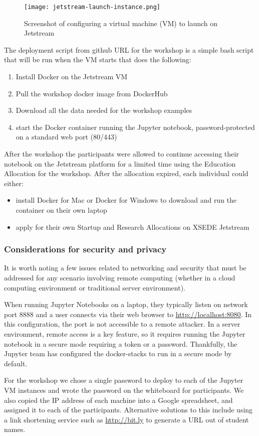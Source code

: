\begin{figure}[h]
\centering
\texttt{[image: jetstream-launch-instance.png]}
\caption{Screenshot of configuring a virtual machine (VM) to launch on Jetstream}
\end{figure}

The deployment script from github URL for the workshop is a simple bash script
that will be run when the VM starts that does the following:

\begin{enumerate}
\item Install Docker on the Jetstream VM
\item Pull the workshop docker image from DockerHub
\item Download all the data needed for the workshop examples
\item start the Docker container running the Jupyter notebook, password-protected on a standard web port (80/443)
\end{enumerate}

After the workshop the participants were allowed to continue accessing their
notebook on the Jetstream platform for a limited time using the Education
Allocation for the workshop. After the allocation expired, each individual could
either:

\begin{itemize}

\item install Docker for Mac or Docker for Windows to download and run the
      container on their own laptop
\item apply for their own Startup and Research Allocations on XSEDE Jetstream

\end{itemize}

\subsubsection{Considerations for security and privacy}

It is worth noting a few issues related to networking and security that must be
addressed for any scenario involving remote computing (whether in a cloud
computing environment or traditional server environment).

When running Jupyter Notebooks on a laptop, they typically listen on network
port 8888 and a user connects via their web browser to
\url{http://localhost:8080}. In this configuration, the port is not accessible
to a remote attacker. In a server environment, remote access is a key
feature, so it requires running the Jupyter notebook in a secure mode requiring
a token or a password. Thankfully, the Jupyter team has configured the
docker-stacks to run in a secure mode by default.

For the workshop we chose a single password to deploy to each of the Jupyter VM
instances and wrote the password on the whiteboard for participants. We also
copied the IP address of each machine into a Google spreadsheet, and assigned it
to each of the participants. Alternative solutions to this include using a link
shortening service such as \url{http://bit.ly} to generate a URL out of student
names.
